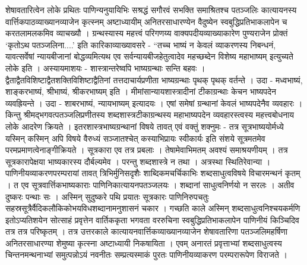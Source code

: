 शेषावतारित्वेन लोके प्रथितः पाणिन्यनुयायिभिः सश्रद्धं सगौरवं सभक्ति समाश्रितश्च पतञ्जलिः कात्यायनस्य वार्त्तिकपाठव्याख्यानव्याजेन कृत्स्नम् अष्टाध्यायीम् अनितरसाधारण्येन वैदुष्येन स्वबुद्धिप्रतिभाकलापेन च करतलामलकमिव व्याचख्यौ । ग्रन्थस्यास्य महत्त्वं परिगणय्य वाक्यपदीयव्याख्याकारेण पुण्यराजेन प्रोक्तं ‘कृतोऽथ पतञ्जलिना....’ इति कारिकाव्याख्यावसरे - “तच्च भाष्यं न केवलं व्याकरणस्य निबन्धनं, यावत्सर्वेषां न्यायबीजानां बोद्धव्यमित्यथ एव सर्वन्यायबीजहेतुत्वादेव महच्छब्देन विशेष्य महाभाष्यम् इत्युच्यते लोके इति । अस्यायमाशयः - शास्त्रान्तरेष्वपि भाष्यग्रन्थाः सन्ति बहवः । द्वैताद्वैतविशिष्टाद्वैतशक्तिविशिष्टाद्वैतिनां तत्तदाचार्यप्रणीता भाष्यग्रन्थाः पृथक् पृथक् वर्तन्ते । उदा - मध्वभाष्यं, शाङ्करभाष्यं, श्रीभाष्यं, श्रीकरभाष्यम् इति । मीमांसान्यायशास्त्रादीनां टीकाग्रन्थाः केचन भाष्यपदेन व्यवह्रियन्ते । उदा - शाबरभाष्यं, न्यायभाष्यम् इत्यादयः । एषां समेषां ग्रन्थानां केवलं भाष्यपदेनैव व्यवहारः । किन्तु श्रीमद्भगवत्पतञ्जलिप्रणीतस्य शब्दशास्त्रटीकाग्रन्थस्य महाभाष्यपदेन व्यवहारस्त्वस्य महत्त्वबोधनाय लोके आदरेण क्रियते । इतरशास्त्रभाष्यग्रन्थानां विषये तावत् एवं वक्तुं शक्नुमः - तत्र सूत्रभाष्ययोर्मध्ये यस्मिन् कस्मिन् अपि विषये वैरुध्यं सञ्जातश्चेत् कस्याभिप्रायः स्वीकार्यः इति संशये सूत्रमतमेव परमप्रमाणत्वेनाङ्गीक्रियते । सूत्रकारा एव तत्र प्रबलाः । तेषामेवाभिमतम् अवश्यं समाश्रयणीयम् । तत्र सूत्रकारापेक्षया भाष्यकारस्य दौर्बल्यमेव । परन्तु शब्दशास्त्रे न तथा । अत्रस्था स्थितिरेवान्या । पाणिनीयव्याकरणपरम्परायां तावत् त्रिभिर्मुनिसदृशैः शाब्दिकमचर्चिकाभिः शब्दसाधुत्वविषये विचारमन्थनं कृतम् । त एव सूत्रवार्त्तिकभाष्यकाराः पाणिनिकात्यायनपतञ्जलयः । शब्दानां साधुत्वनिर्णयो न सरलः । अतीव दुष्करः पन्थाः सः । अस्मिन् सुदुष्करे पथि प्रयातः सूत्रकारः पाणिनिरुपचतुः सहस्रसूत्रैर्वैदिकलौकिकोभयविधशब्दानामनुशासनं चकार । गच्छति काले अस्मिन् शब्दसाधुत्वनिश्चयकर्मणि इतोऽप्यतिशयेन सोत्साहं प्रवृत्तेन वार्तिककृता भगवता वररुचिना स्वबुद्धिप्रतिभाकलापेन पाणिनीयं किञ्चिदिव तत्र तत्र परिष्कृतम् । तत्र उत्तरकाले कात्यायनवार्त्तिकव्याख्यानव्याजेन शेषावतारिणा पतञ्जलिमहर्षिणा अनितरसाधारण्या शेमुष्या कृत्स्ना अष्टाध्यायी निकषायिता । एवम् अनारतं प्रवृत्ताभ्यां शब्दसाधुत्वस्य चिन्तनमन्थनाभ्यां समुत्पन्नोऽयं नवनीतः सम्प्रत्यस्माकं पुरतः पाणिनीयव्याकरण परम्परारूपेण विराजते ।

